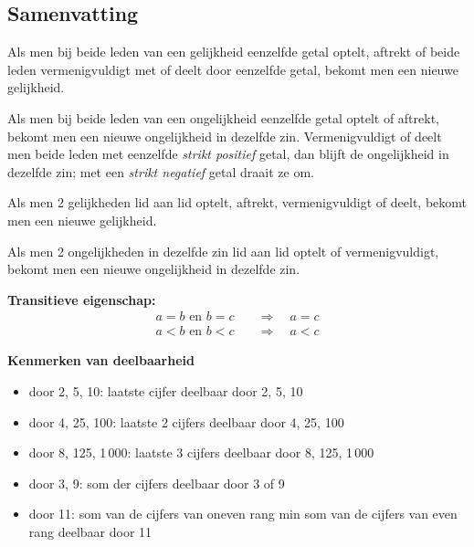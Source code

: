 \documentclass{bis}
\begin{document}
\pagebreak
\begin{mdframed}
  \subsection*{Samenvatting}

  Als men bij beide leden van een gelijkheid eenzelfde getal optelt, aftrekt of beide leden
  vermenigvuldigt met of deelt door eenzelfde getal, bekomt men een nieuwe gelijkheid.

  Als men bij beide leden van een ongelijkheid eenzelfde getal optelt of aftrekt, bekomt men een
  nieuwe ongelijkheid in dezelfde zin. Vermenigvuldigt of deelt men beide leden met eenzelfde
  \emph{strikt positief} getal, dan blijft de ongelijkheid in dezelfde zin; met een \emph{strikt
    negatief} getal draait ze om.

  Als men 2 gelijkheden lid aan lid optelt, aftrekt, vermenigvuldigt of deelt, bekomt men een
  nieuwe gelijkheid.

  Als men 2 ongelijkheden in dezelfde zin lid aan lid optelt of vermenigvuldigt, bekomt men een
  nieuwe ongelijkheid in dezelfde zin.

  \textbf{Transitieve eigenschap:}
  \begin{align*}
    a=b\text{ en }b=c&\quad\Rightarrow\quad a=c\\
    a<b\text{ en }b<c&\quad\Rightarrow\quad a<c
  \end{align*}

  \textbf{Kenmerken van deelbaarheid}
  \begin{itemize}
  \item door 2, 5, 10: laatste cijfer deelbaar door 2, 5, 10
  \item door 4, 25, 100: laatste 2 cijfers deelbaar door 4, 25, 100
  \item door 8, 125, 1\,000: laatste 3 cijfers deelbaar door 8, 125, 1\,000
  \item door 3, 9: som der cijfers deelbaar door 3 of 9
  \item door 11: som van de cijfers van oneven rang min som van de cijfers van even rang
    deelbaar door 11
  \end{itemize}
\end{mdframed}

\oplossingen
\end{document}
